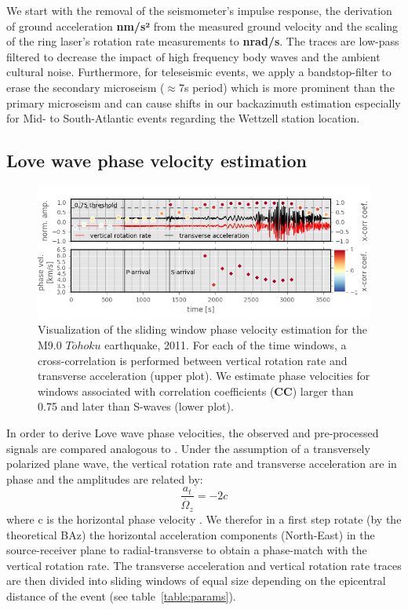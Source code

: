 \documentclass[12pt,reqno,letter]{article} %
\begin{document}
We start with the removal of the seismometer’s impulse response, the derivation of ground acceleration \textbf{nm/s²} from the measured ground velocity and the scaling of the ring laser's rotation rate measurements to \textbf{nrad/s}. The traces are low-pass filtered to decrease the impact of high frequency body waves and the ambient cultural noise. Furthermore, for teleseismic events, we apply a bandstop-filter to erase the secondary microseism ($\approx$7s period) which is more prominent than the primary microseism \citep{Hadziioannou2012} and can cause shifts in our backazimuth estimation especially for Mid- to South-Atlantic events regarding the Wettzell station location.
%
\subsection{Love wave phase velocity estimation}
\begin{figure}[!htp]
\centering
\includegraphics[width=\textwidth]{paper_plot1.png}
\caption{Visualization of the sliding window phase velocity estimation for the M9.0 $T\overline{o}hoku$ earthquake, 2011. For each of the time windows, a cross-correlation is performed between vertical rotation rate and transverse acceleration (upper plot). We estimate phase velocities for windows associated with correlation coefficients (\textbf{CC}) larger than 0.75 and later than S-waves (lower plot).}
\label{fig:phase_vel}
\end{figure}
\noindent
In order to derive Love wave phase velocities, the observed and pre-processed signals are compared analogous to \cite{Igel2005}. Under the assumption of a transversely polarized plane wave, the vertical rotation rate and transverse acceleration are in phase and the amplitudes are related by: 
\begin{equation}
	\frac{a_t}{\dot{\Omega_z}} = -2c
\end{equation}
where c is the horizontal phase velocity \citep{McLeod1998, Pancha2000}. We therefor in a first step rotate (by the theoretical BAz) the horizontal acceleration components (North-East) in the source-receiver plane to radial-transverse to obtain a phase-match with the vertical rotation rate. The transverse acceleration and vertical rotation rate traces are then divided into sliding windows of equal size depending on the epicentral distance of the event (see table~\ref{table:params}).
\end{document}
